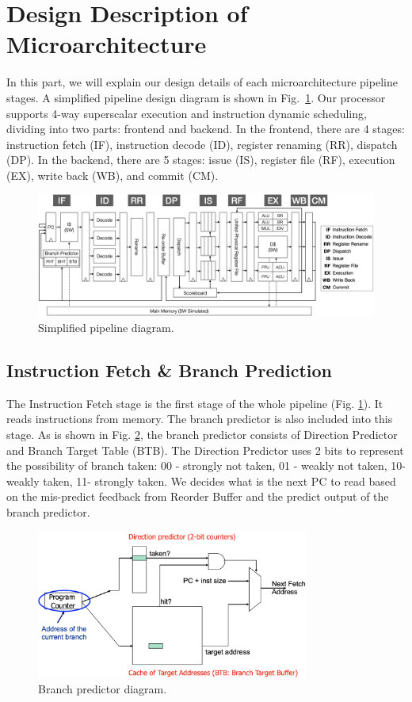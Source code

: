 \section{Design Description of Microarchitecture}
In this part, we will explain our design details of each microarchitecture pipeline stages. A simplified pipeline design diagram is shown in Fig.~\ref{fig:pipeline}. Our processor supports 4-way superscalar execution and instruction dynamic scheduling, dividing into two parts: frontend and backend. In the frontend, there are 4 stages: instruction fetch (IF), instruction decode (ID), register renaming (RR), dispatch (DP). In the backend, there are 5 stages: issue (IS), register file (RF), execution (EX), write back (WB), and commit (CM).

\begin{figure}
    \centering
    \includegraphics[width=\textwidth]{figure/design.png}
    \caption{Simplified pipeline diagram.}
    \label{fig:pipeline}
\end{figure}

\subsection{Instruction Fetch \& Branch Prediction} %
The Instruction Fetch stage is the first stage of the whole pipeline (Fig. \ref{fig:pipeline}). It reads instructions from memory. The branch predictor is also included into this stage. As is shown in Fig. \ref{fig:br_pred}, the branch predictor consists of Direction Predictor and Branch Target Table (BTB). The Direction Predictor uses 2 bits to represent the possibility of branch taken: 00 - strongly not taken, 01 - weakly not taken, 10- weakly taken, 11- strongly taken. We decides what is the next PC to read based on the mis-predict feedback from Reorder Buffer and the predict output of the branch predictor.
\begin{figure}[!htp]
    \centering
    \includegraphics[width=0.8\textwidth]{figure/branch_predictor.png}
    \caption{Branch predictor diagram.}
    \label{fig:br_pred}
\end{figure}

